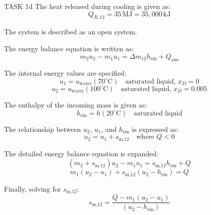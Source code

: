 TASK 1d  
The heat released during cooling is given as:  
\[
Q_{R,12} = 35 \, \text{MJ} = 35,000 \, \text{kJ}
\]  

The system is described as an open system.  

The energy balance equation is written as:  
\[
m_2 u_2 - m_1 u_1 = \Delta m_{12} h_{\text{ein}} + Q_{\text{aus}}
\]  

The internal energy values are specified:  
\[
u_1 = u_{\text{water}}(70^\circ\text{C}) \quad \text{saturated liquid, } x_D = 0
\]  
\[
u_2 = u_{\text{water}}(100^\circ\text{C}) \quad \text{saturated liquid, } x_D = 0.005
\]  

The enthalpy of the incoming mass is given as:  
\[
h_{\text{ein}} = h(20^\circ\text{C}) \quad \text{saturated liquid}
\]  

The relationship between \( u_2 \), \( u_1 \), and \( h_{\text{ein}} \) is expressed as:  
\[
u_2 = u_1 + s_{\text{m,12}} \quad \text{where } Q < 0
\]  

The detailed energy balance equation is expanded:  
\[
(m_2 + s_{\text{m,12}}) u_2 - m_1 u_1 = s_{\text{m,12}} h_{\text{ein}} + Q
\]  
\[
m_1 (u_2 - u_1) + s_{\text{m,12}} (u_2 - h_{\text{ein}}) = Q
\]  

Finally, solving for \( s_{\text{m,12}} \):  
\[
s_{\text{m,12}} = \frac{Q - m_1 (u_2 - u_1)}{(u_2 - h_{\text{ein}})}
\]